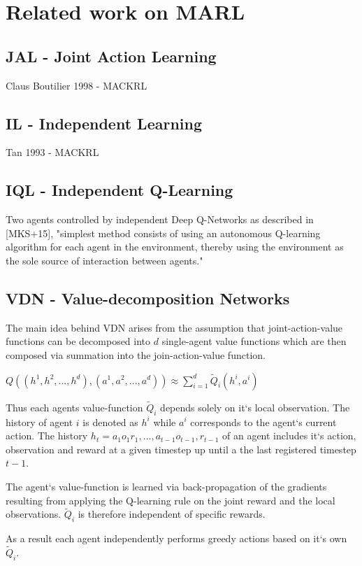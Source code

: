 \chapter{Related work on MARL}

%
%
%
\section{JAL - Joint Action Learning}
Claus Boutilier 1998 - MACKRL
\section{IL - Independent Learning}
Tan 1993 - MACKRL
%
%
%
\section{IQL - Independent Q-Learning}
Two agents controlled by independent Deep Q-Networks as described in [MKS+15], "simplest method consists of using an autonomous Q-learning algorithm for each agent
in the environment, thereby using the environment as the sole source of interaction between agents."
%
%
%
\section{VDN - Value-decomposition Networks}
The main idea behind VDN arises from the assumption that joint-action-value functions can be decomposed into $ \mathit{d} $ single-agent value functions which are then composed via summation into the join-action-value function.

\begin{center}
	$ Q((h^1, h^2, ..., h^d),(a^1, a^2, ..., a^d)) \approx \sum_{i=1}^{d} \tilde{Q}_i(h^i, a^i) $
\end{center}

Thus each agents value-function $ \tilde{Q}_i $ depends solely on it`s local observation. The history of agent $\mathit{i}$ is denoted as $h^i$ while $a^i$ corresponds to the agent`s current action. The history $h_t = a_1o_1r_1,...,a_{t-1}o_{t-1},r_{t-1}$ of an agent includes it`s action, observation and reward at a given timestep up until a the last registered timestep ${t-1}$. 

The agent`s value-function is learned via back-propagation of the gradients resulting from applying the Q-learning rule on the joint reward and the local observations. $ \tilde{Q}_i $ is therefore independent of specific rewards.

As a result each agent independently performs greedy actions based on it`s own $ \tilde{Q}_i $.
%
%
%


